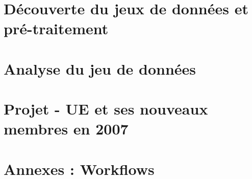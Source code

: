 \documentclass[a4paper]{article}
\begin{document}
\newpage
\tableofcontents
\newpage



\part{Découverte du jeux de données et pré-traitement}


   



  \newpage 
\part{Analyse du jeu de données}






\newpage
\part{Projet - UE et ses nouveaux membres en 2007}




   



\newpage
\part{Annexes : Workflows}


 
\end{document}
